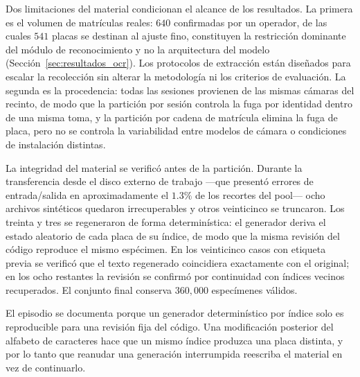 Dos limitaciones del material condicionan el alcance de los resultados. La primera
es el volumen de matrículas reales: $640$ confirmadas por un operador, de las
cuales $541$ placas se destinan al ajuste fino, constituyen la restricción
dominante del módulo de reconocimiento y no la arquitectura del modelo
(Sección~\ref{sec:resultados_ocr}). Los protocolos de extracción están diseñados
para escalar la recolección sin alterar la metodología ni los criterios de
evaluación. La segunda es la procedencia: todas las sesiones provienen de las
mismas cámaras del recinto, de modo que la partición por sesión controla la fuga
por identidad dentro de una misma toma, y la partición por cadena de matrícula
elimina la fuga de placa, pero no se controla la variabilidad entre modelos de
cámara o condiciones de instalación distintas.

La integridad del material se verificó antes de la partición. Durante la
transferencia desde el disco externo de trabajo ---que presentó errores de
entrada/salida en aproximadamente el $1{.}3\%$ de los recortes del pool--- ocho
archivos sintéticos quedaron irrecuperables y otros veinticinco se truncaron. Los
treinta y tres se regeneraron de forma determinística: el generador deriva el
estado aleatorio de cada placa de su índice, de modo que la misma revisión del
código reproduce el mismo espécimen. En los veinticinco casos con etiqueta previa
se verificó que el texto regenerado coincidiera exactamente con el original; en
los ocho restantes la revisión se confirmó por continuidad con índices vecinos
recuperados. El conjunto final conserva $360{,}000$ especímenes válidos.

El episodio se documenta porque un generador determinístico por índice solo es
reproducible para una revisión fija del código. Una modificación posterior del
alfabeto de caracteres hace que un mismo índice produzca una placa distinta, y por
lo tanto que reanudar una generación interrumpida reescriba el material en vez de
continuarlo.
